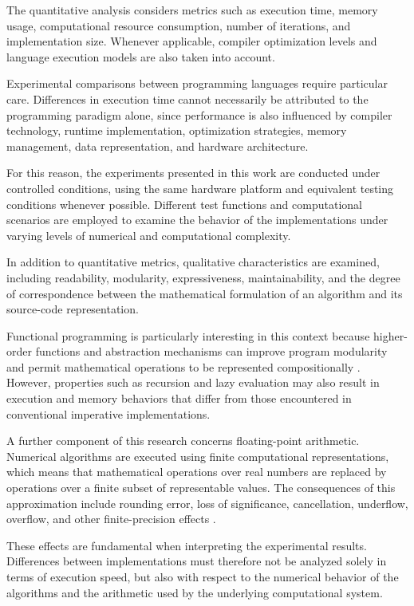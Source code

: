 The quantitative analysis considers metrics such as execution time, memory
usage, computational resource consumption, number of iterations, and
implementation size. Whenever applicable, compiler optimization levels and
language execution models are also taken into account.

Experimental comparisons between programming languages require particular
care. Differences in execution time cannot necessarily be attributed to the
programming paradigm alone, since performance is also influenced by compiler
technology, runtime implementation, optimization strategies, memory
management, data representation, and hardware architecture.

For this reason, the experiments presented in this work are conducted under
controlled conditions, using the same hardware platform and equivalent testing
conditions whenever possible. Different test functions and computational
scenarios are employed to examine the behavior of the implementations under
varying levels of numerical and computational complexity.

In addition to quantitative metrics, qualitative characteristics are examined,
including readability, modularity, expressiveness, maintainability, and the
degree of correspondence between the mathematical formulation of an algorithm
and its source-code representation.

Functional programming is particularly interesting in this context because
higher-order functions and abstraction mechanisms can improve program
modularity and permit mathematical operations to be represented compositionally
\cite{hughes1989functional}. However, properties such as recursion and lazy
evaluation may also result in execution and memory behaviors that differ from
those encountered in conventional imperative implementations.

A further component of this research concerns floating-point arithmetic.
Numerical algorithms are executed using finite computational representations,
which means that mathematical operations over real numbers are replaced by
operations over a finite subset of representable values. The consequences of
this approximation include rounding error, loss of significance, cancellation,
underflow, overflow, and other finite-precision effects
\cite{higham2002accuracy,ieee7542019}.

These effects are fundamental when interpreting the experimental results.
Differences between implementations must therefore not be analyzed solely in
terms of execution speed, but also with respect to the numerical behavior of
the algorithms and the arithmetic used by the underlying computational system.

